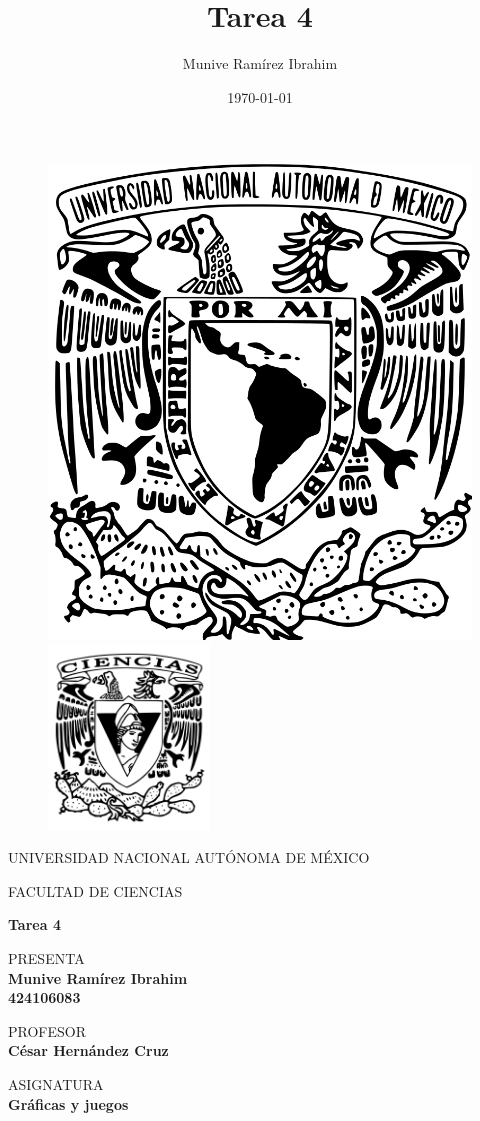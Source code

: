 
\title{Tarea 4}
\author{Munive Ramírez Ibrahim}
\date{\today}

\thispagestyle{empty}
\begin{figure}[ht]
	\includegraphics[width = 4 cm]{logo_unam.png}
	\endminipage
	\includegraphics[height = 4.9cm, width = 4 cm]{logo_ciencias.png}
	\endminipage
\end{figure}

\begin{center}
	\vspace{0.5cm}
	\LARGE
	UNIVERSIDAD NACIONAL AUTÓNOMA DE MÉXICO

	\vspace{0.5cm}
	\LARGE
	FACULTAD DE CIENCIAS

	\vspace{1.5cm}
	\Large
	\textbf{Tarea 4}

	\vspace{1cm}
	\normalsize
	PRESENTA \\
	\vspace{.3cm}
	\large
	\textbf{Munive Ramírez Ibrahim  \\ 424106083}

	\vspace{1cm}
	\normalsize
	PROFESOR \\
	\vspace{.3cm}
	\large
	\textbf{César Hernández Cruz}

	\vspace{1cm}
	\normalsize
	ASIGNATURA \\
	\vspace{.3cm}
	\large
	\textbf{Gráficas y juegos}

	\vspace{1cm}
\end{center}

\newpage
